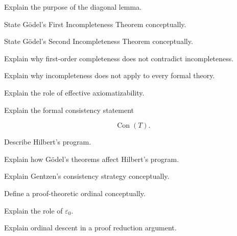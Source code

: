 \begin{exercise}[3]
Explain the purpose of the diagonal lemma.
\end{exercise}

\begin{exercise}[3]
State Gödel's First Incompleteness Theorem conceptually.
\end{exercise}

\begin{exercise}[3]
State Gödel's Second Incompleteness Theorem conceptually.
\end{exercise}

\begin{exercise}[3]
Explain why first-order completeness does not contradict incompleteness.
\end{exercise}

\begin{exercise}[3]
Explain why incompleteness does not apply to every formal theory.
\end{exercise}

\begin{exercise}[3]
Explain the role of effective axiomatizability.
\end{exercise}

\begin{exercise}[3]
Explain the formal consistency statement

\[
\operatorname{Con}(T).
\]
\end{exercise}

\begin{exercise}[3]
Describe Hilbert's program.
\end{exercise}

\begin{exercise}[3]
Explain how Gödel's theorems affect Hilbert's program.
\end{exercise}

\begin{exercise}[3]
Explain Gentzen's consistency strategy conceptually.
\end{exercise}

\begin{exercise}[3]
Define a proof-theoretic ordinal conceptually.
\end{exercise}

\begin{exercise}[3]
Explain the role of \(\varepsilon_0\).
\end{exercise}

\begin{exercise}[3]
Explain ordinal descent in a proof reduction argument.
\end{exercise}

